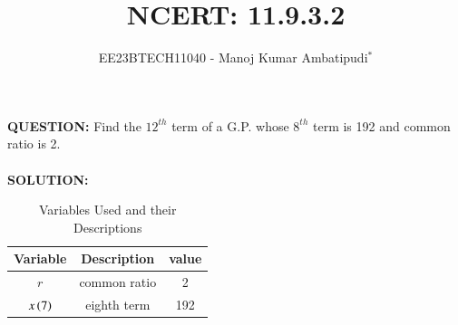 \documentclass[journal,12pt,twocolumn]{IEEEtran}
\theoremstyle{remark}
\begin{document}

\vspace{3cm}
\title{NCERT: 11.9.3.2}
\author{EE23BTECH11040 - Manoj Kumar Ambatipudi$^{*}$%
}
\maketitle
\newpage
\bigskip
\renewcommand{\thefigure}{\theenumi}
\renewcommand{\thetable}{\theenumi}
\textbf{QUESTION:}
Find the $12^{th}$ term of a G.P. whose $8^{th}$ term is 192 and common ratio is 2.\\\\
\textbf{SOLUTION:}
\fi
\begin{table}[h!!]
\renewcommand\thetable{1}
    \centering
    \begin{tabular}{|c|c|c|}
    \hline
        Variable&             Description&value\\\hline
             $r$&            common ratio&2    \\\hline
     $x\brak{7}$&              eighth term&192  \\\hline
    \end{tabular}
    \caption{Variables Used and their Descriptions}
    \label{tab 11.9.3.2.1}
\end{table}
\end{document}
